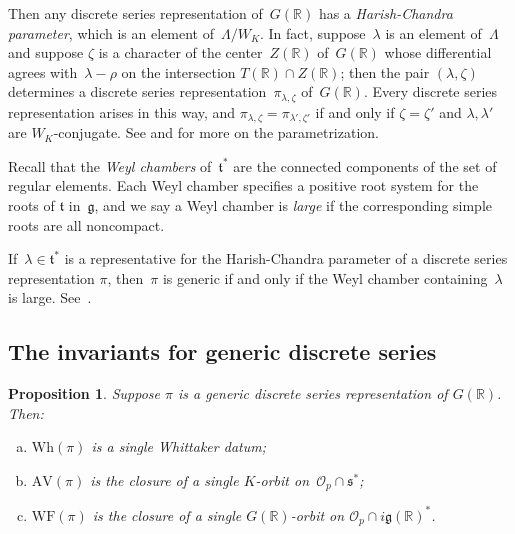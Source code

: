 \documentclass[10pt,leqno]{article}
\newtheorem{proposition}[equation]{Proposition}
\numberwithin{equation}{section}
\newcommand{\R}{\mathbb R}
\newcommand{\g}{\mathfrak g}
\newcommand{\s}{\mathfrak s}
\newcommand{\AV}{\mathrm{AV}}
\newcommand{\Wh}{\mathrm{Wh}}
\newcommand{\WF}{\mathrm{WF}}
\begin{document}
Then any discrete series representation of~$G(\R)$ has a \emph{Harish-Chandra parameter}, which is an element of~$\Lambda/W_K$. In fact, suppose~$\lambda$ is an element of~$\Lambda$ and suppose $\zeta$ is a character of the center~$Z(\R)$ of~$G(\R)$ whose differential agrees with~$\lambda-\rho$ on the intersection $T(\R) \cap Z(\R)$; then the pair $(\lambda, \zeta)$  determines a discrete series representation~$\pi_{\lambda, \zeta}$ of~$G(\R)$. Every discrete series representation arises in this way, and $\pi_{\lambda, \zeta}=\pi_{\lambda', \zeta'}$ if and only if $\zeta=\zeta'$ and $\lambda, \lambda'$ are $W_K$-conjugate. See  \cite[Section 8]{AV1} and \cite{Contragredient} for more on the parametrization.  

Recall that the \emph{Weyl chambers} of~$\mathfrak{t}^\ast$ are the connected components of the set of regular elements. Each Weyl chamber specifies a positive root system for the roots of $\mathfrak{t}$ in~$\g$, and we say a Weyl chamber is \emph{large} if the corresponding simple roots are all noncompact. 

If~$\lambda \in \mathfrak{t}^\ast$ is a representative for the Harish-Chandra parameter of a discrete series representation $\pi$, then~$\pi$ is generic if and only if the Weyl chamber containing~$\lambda$ is large. See~\cite[Section 6]{vogan-gelfand-kirillov}.


\subsection{The invariants for generic discrete series} 

\begin{proposition} \label{invariants_ds}
  Suppose $\pi$ is a generic discrete series representation of $G(\R)$. Then\textup{:}
\begin{enumerate}[(a)]
\item $\Wh(\pi)$ is a single Whittaker datum\textup{;}
\item $\AV(\pi)$ is the closure of a single $K$-orbit on~$\mathcal{O}_p \cap \s^*$\textup{;}
\item  $\WF(\pi)$ is the closure of a single $G(\R)$-orbit on $\mathcal{O}_p \cap  i \g(\R)^*$\textup{.}
\end{enumerate}
\end{proposition}
\end{document}

